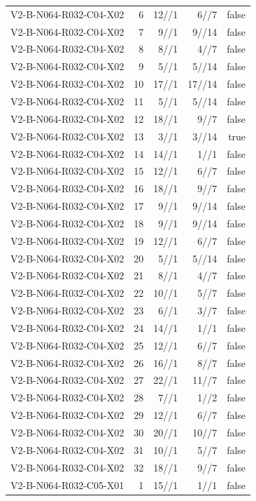 {\begin{longtable}{lrrrr}
V2-B-N064-R032-C04-X02 & 6 & 12//1 & 6//7 & false \\
V2-B-N064-R032-C04-X02 & 7 & 9//1 & 9//14 & false \\
V2-B-N064-R032-C04-X02 & 8 & 8//1 & 4//7 & false \\
V2-B-N064-R032-C04-X02 & 9 & 5//1 & 5//14 & false \\
V2-B-N064-R032-C04-X02 & 10 & 17//1 & 17//14 & false \\
V2-B-N064-R032-C04-X02 & 11 & 5//1 & 5//14 & false \\
V2-B-N064-R032-C04-X02 & 12 & 18//1 & 9//7 & false \\
V2-B-N064-R032-C04-X02 & 13 & 3//1 & 3//14 & true \\
V2-B-N064-R032-C04-X02 & 14 & 14//1 & 1//1 & false \\
V2-B-N064-R032-C04-X02 & 15 & 12//1 & 6//7 & false \\
V2-B-N064-R032-C04-X02 & 16 & 18//1 & 9//7 & false \\
V2-B-N064-R032-C04-X02 & 17 & 9//1 & 9//14 & false \\
V2-B-N064-R032-C04-X02 & 18 & 9//1 & 9//14 & false \\
V2-B-N064-R032-C04-X02 & 19 & 12//1 & 6//7 & false \\
V2-B-N064-R032-C04-X02 & 20 & 5//1 & 5//14 & false \\
V2-B-N064-R032-C04-X02 & 21 & 8//1 & 4//7 & false \\
V2-B-N064-R032-C04-X02 & 22 & 10//1 & 5//7 & false \\
V2-B-N064-R032-C04-X02 & 23 & 6//1 & 3//7 & false \\
V2-B-N064-R032-C04-X02 & 24 & 14//1 & 1//1 & false \\
V2-B-N064-R032-C04-X02 & 25 & 12//1 & 6//7 & false \\
V2-B-N064-R032-C04-X02 & 26 & 16//1 & 8//7 & false \\
V2-B-N064-R032-C04-X02 & 27 & 22//1 & 11//7 & false \\
V2-B-N064-R032-C04-X02 & 28 & 7//1 & 1//2 & false \\
V2-B-N064-R032-C04-X02 & 29 & 12//1 & 6//7 & false \\
V2-B-N064-R032-C04-X02 & 30 & 20//1 & 10//7 & false \\
V2-B-N064-R032-C04-X02 & 31 & 10//1 & 5//7 & false \\
V2-B-N064-R032-C04-X02 & 32 & 18//1 & 9//7 & false \\
V2-B-N064-R032-C05-X01 & 1 & 15//1 & 1//1 & false \\

\end{longtable}}
